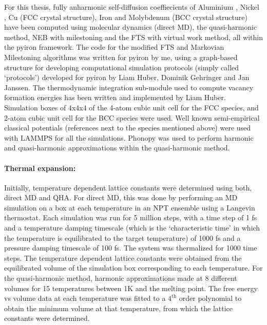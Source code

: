 \documentclass{article}
\begin{document}
For this thesis, fully anharmonic self-diffusion coeffiecients of Aluminium \cite{Mendelev2009a}, Nickel \cite{Mishin2004}, Cu \cite{Mendelev2008} (FCC crystal structure), Iron \cite{Ackland1997} and Molybdenum \cite{Zhou2004} (BCC crystal structure) have been computed using molecular dynamics (direct MD), the quasi-harmonic method, NEB with milestoning and the FTS with virtual work method, all within the pyiron framework. The code for the modified FTS and Markovian Milestoning algorithms was written for pyiron by me, using a graph-based structure for developing computational simulation protocols (simply called \enquote*{protocols}) developed for pyiron by Liam Huber, Dominik Gehringer and Jan Janssen. The thermodynamic integration sub-module used to compute vacancy formation energies has been written and implemented by Liam Huber. \\

\noindent Simulation boxes of 4x4x4 of the 4-atom cubic unit cell for the FCC species, and 2-atom cubic unit cell for the BCC species were used. Well known semi-empirical classical potentials (references next to the species mentioned above) were used with LAMMPS for all the simulations. Phonopy \cite{Togo2015} was used to perform harmonic and quasi-harmonic approximations within the quasi-harmonic method.

\paragraph*{Thermal expansion:}

Initially, temperature dependent lattice constants were determined using both, direct MD and QHA. For direct MD, this was done by performing an MD simulation on a box at each temperature in an NPT ensemble using a Langevin thermostat. Each simulation was run for 5 million steps, with a time step of 1 fs and a temperature damping timescale (which is the \enquote*{characteristic time} in which the temperature is equilibrated to the target temperature) of 1000 fs and a pressure damping timescale of 100 fs. The system was thermalized for 1000 time steps. The temperature dependent lattice constants were obtained from the equilibrated volume of the simulation box corresponding to each temperature. For the quasi-harmonic method, harmonic approximations made at 8 different volumes for 15 temperatures between 1K and the melting point. The free energy vs volume data at each temperature was fitted to a $4^{\mathrm{th}}$ order polynomial to obtain the minimum volume at that temperature, from which the lattice constants were determined. 
\end{document}
